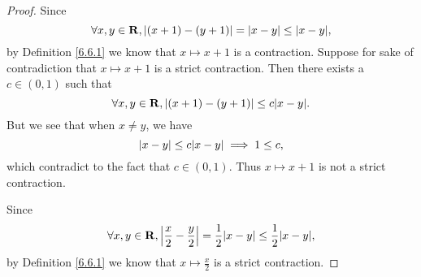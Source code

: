 \begin{proof}
    Since
    \[
        \forall x, y \in \R, \abs{(x + 1) - (y + 1)} = \abs{x - y} \leq \abs{x - y},
    \]
    by Definition \ref{6.6.1} we know that \(x \mapsto x + 1\) is a contraction.
    Suppose for sake of contradiction that \(x \mapsto x + 1\) is a strict contraction.
    Then there exists a \(c \in (0, 1)\) such that
    \[
        \forall x, y \in \R, \abs{(x + 1) - (y + 1)} \leq c \abs{x - y}.
    \]
    But we see that when \(x \neq y\), we have
    \[
        \abs{x - y} \leq c \abs{x - y} \implies 1 \leq c,
    \]
    which contradict to the fact that \(c \in (0, 1)\).
    Thus \(x \mapsto x + 1\) is not a strict contraction.

    Since
    \[
        \forall x, y \in \R, \abs{\frac{x}{2} - \frac{y}{2}} = \frac{1}{2} \abs{x - y} \leq \frac{1}{2} \abs{x - y},
    \]
    by Definition \ref{6.6.1} we know that \(x \mapsto \frac{x}{2}\) is a strict contraction.


\end{proof}
